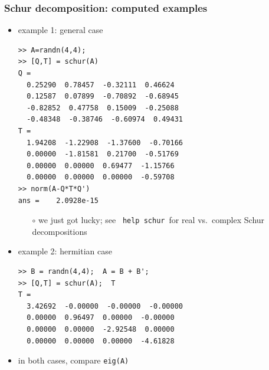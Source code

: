 \documentclass[10pt,hyperref]{beamer}
\begin{document}
\begin{frame}[fragile]
\frametitle{Schur decomposition: computed examples}

\begin{itemize}
\item example 1: general case
\begin{Verbatim}[fontsize=\scriptsize]
>> A=randn(4,4);
>> [Q,T] = schur(A)
Q =
  0.25290  0.78457  -0.32111  0.46624
  0.12587  0.07899  -0.70892  -0.68945
  -0.82852  0.47758  0.15009  -0.25088
  -0.48348  -0.38746  -0.60974  0.49431
T =
  1.94208  -1.22908  -1.37600  -0.70166
  0.00000  -1.81581  0.21700  -0.51769
  0.00000  0.00000  0.69477  -1.15766
  0.00000  0.00000  0.00000  -0.59708
>> norm(A-Q*T*Q')
ans =    2.0928e-15
\end{Verbatim}
    \begin{itemize}
    \footnotesize
    \item[$\circ$] we just got lucky; see \, \texttt{help schur}\, for real vs.~complex Schur decompositions
    \end{itemize}
\item example 2: hermitian case
\begin{Verbatim}[fontsize=\scriptsize]
>> B = randn(4,4);  A = B + B';
>> [Q,T] = schur(A);  T
T =
  3.42692  -0.00000  -0.00000  -0.00000
  0.00000  0.96497  0.00000  -0.00000
  0.00000  0.00000  -2.92548  0.00000
  0.00000  0.00000  0.00000  -4.61828
\end{Verbatim}

\medskip
\item in both cases, compare \texttt{eig(A)}
\end{itemize}
\end{frame}
\end{document}
